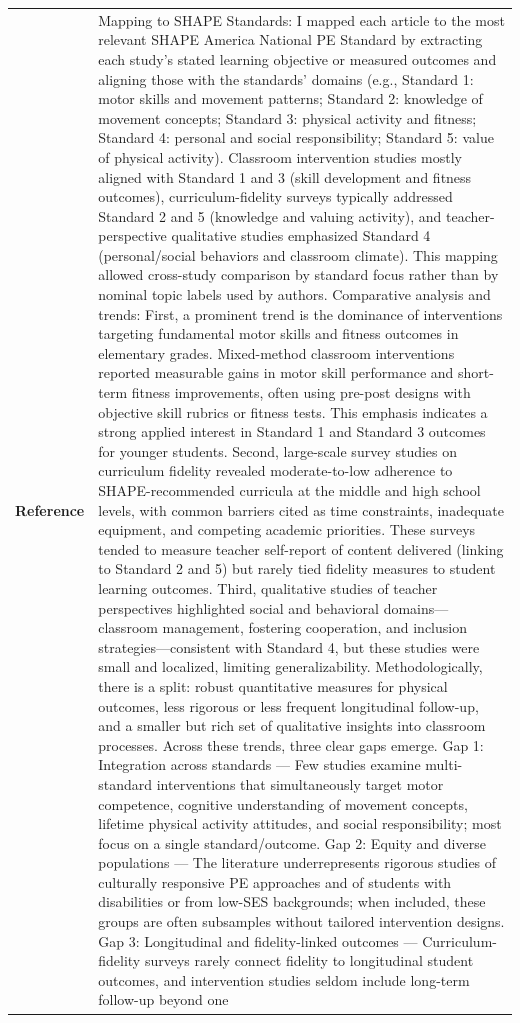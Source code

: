 \begin{longtable}{@{}l p{12.5cm}@{}}
  \textbf{Reference} & Mapping to SHAPE Standards: I mapped each article to the most relevant SHAPE America National PE Standard by extracting each study's stated learning objective or measured outcomes and aligning those with the standards' domains (e.g., Standard 1: motor skills and movement patterns; Standard 2: knowledge of movement concepts; Standard 3: physical activity and fitness; Standard 4: personal and social responsibility; Standard 5: value of physical activity). Classroom intervention studies mostly aligned with Standard 1 and 3 (skill development and fitness outcomes), curriculum-fidelity surveys typically addressed Standard 2 and 5 (knowledge and valuing activity), and teacher-perspective qualitative studies emphasized Standard 4 (personal/social behaviors and classroom climate). This mapping allowed cross-study comparison by standard focus rather than by nominal topic labels used by authors. \newline Comparative analysis and trends: First, a prominent trend is the dominance of interventions targeting fundamental motor skills and fitness outcomes in elementary grades. Mixed-method classroom interventions reported measurable gains in motor skill performance and short-term fitness improvements, often using pre-post designs with objective skill rubrics or fitness tests. This emphasis indicates a strong applied interest in Standard 1 and Standard 3 outcomes for younger students. Second, large-scale survey studies on curriculum fidelity revealed moderate-to-low adherence to SHAPE-recommended curricula at the middle and high school levels, with common barriers cited as time constraints, inadequate equipment, and competing academic priorities. These surveys tended to measure teacher self-report of content delivered (linking to Standard 2 and 5) but rarely tied fidelity measures to student learning outcomes. Third, qualitative studies of teacher perspectives highlighted social and behavioral domains---classroom management, fostering cooperation, and inclusion strategies---consistent with Standard 4, but these studies were small and localized, limiting generalizability. Methodologically, there is a split: robust quantitative measures for physical outcomes, less rigorous or less frequent longitudinal follow-up, and a smaller but rich set of qualitative insights into classroom processes. \newline Across these trends, three clear gaps emerge. Gap 1: Integration across standards --- Few studies examine multi-standard interventions that simultaneously target motor competence, cognitive understanding of movement concepts, lifetime physical activity attitudes, and social responsibility; most focus on a single standard/outcome. Gap 2: Equity and diverse populations --- The literature underrepresents rigorous studies of culturally responsive PE approaches and of students with disabilities or from low-SES backgrounds; when included, these groups are often subsamples without tailored intervention designs. Gap 3: Longitudinal and fidelity-linked outcomes --- Curriculum-fidelity surveys rarely connect fidelity to longitudinal student outcomes, and intervention studies seldom include long-term follow-up beyond one 
\end{longtable}
